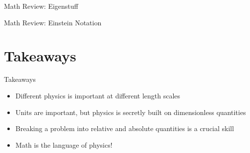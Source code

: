 \documentclass[10pt,xcolor={table,dvipsnames},t]{beamer}
\begin{document}
\begin{frame}{Math Review: Eigenstuff}
\end{frame}

\begin{frame}{Math Review: Einstein Notation}
\end{frame}

\section{Takeaways}

\begin{frame}{Takeaways}
    \begin{itemize}
        \item Different physics is important at different length scales
        \item Units are important, but physics is secretly built on dimensionless quantities
        \item Breaking a problem into relative and absolute quantities is a crucial skill
        \item Math is the language of physics!
    \end{itemize}
\end{frame}
\end{document}
